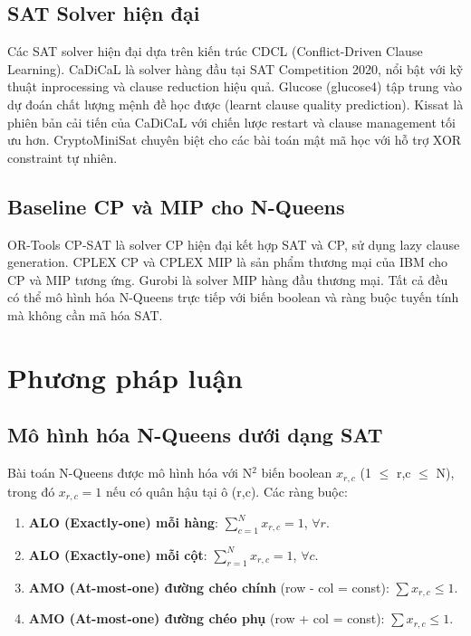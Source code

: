 \documentclass[a4paper,fleqn]{cas-sc}
\begin{document}
\subsection{SAT Solver hiện đại}
Các SAT solver hiện đại dựa trên kiến trúc CDCL (Conflict-Driven Clause Learning). CaDiCaL \citep{biere2020cadical, cadical2024} là solver hàng đầu tại SAT Competition 2020, nổi bật với kỹ thuật inprocessing và clause reduction hiệu quả. Glucose \citep{audemard2009predicting, glucose2024} (glucose4) tập trung vào dự đoán chất lượng mệnh đề học được (learnt clause quality prediction). Kissat \citep{biere2021kissat} là phiên bản cải tiến của CaDiCaL với chiến lược restart và clause management tối ưu hơn. CryptoMiniSat \citep{soos2009cryptominisat} chuyên biệt cho các bài toán mật mã học với hỗ trợ XOR constraint tự nhiên.

\subsection{Baseline CP và MIP cho N-Queens}
OR-Tools CP-SAT \citep{perron2019ortools, ortools2024} là solver CP hiện đại kết hợp SAT và CP, sử dụng lazy clause generation. CPLEX CP và CPLEX MIP là sản phẩm thương mại của IBM cho CP và MIP tương ứng. Gurobi là solver MIP hàng đầu thương mại. Tất cả đều có thể mô hình hóa N-Queens trực tiếp với biến boolean và ràng buộc tuyến tính mà không cần mã hóa SAT.

\section{Phương pháp luận}
\label{sec:methodology}

\subsection{Mô hình hóa N-Queens dưới dạng SAT}
\label{sec:sat-modeling}

Bài toán N-Queens được mô hình hóa với N$^2$ biến boolean $x_{r,c}$ (1 $\le$ r,c $\le$ N), trong đó $x_{r,c} = 1$ nếu có quân hậu tại ô (r,c). Các ràng buộc:

\begin{enumerate}
    \item \textbf{ALO (Exactly-one) mỗi hàng}: $\sum_{c=1}^N x_{r,c} = 1$, $\forall r$.
    \item \textbf{ALO (Exactly-one) mỗi cột}: $\sum_{r=1}^N x_{r,c} = 1$, $\forall c$.
    \item \textbf{AMO (At-most-one) đường chéo chính} (row - col = const): $\sum x_{r,c} \le 1$.
    \item \textbf{AMO (At-most-one) đường chéo phụ} (row + col = const): $\sum x_{r,c} \le 1$.
\end{enumerate}
\end{document}
